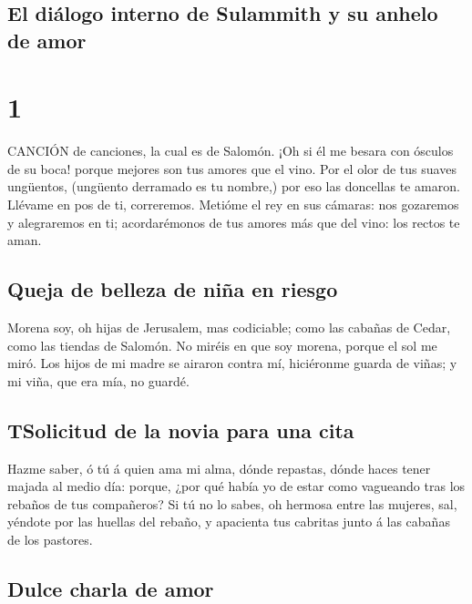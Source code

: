 \hypertarget{el-diuxe1logo-interno-de-sulammith-y-su-anhelo-de-amor}{%
\subsection{El diálogo interno de Sulammith y su anhelo de
amor}\label{el-diuxe1logo-interno-de-sulammith-y-su-anhelo-de-amor}}

\hypertarget{section}{%
\section{1}\label{section}}

 CANCIÓN de canciones, la cual es de Salomón. 
¡Oh si él me besara con ósculos de su boca! porque mejores son tus
amores que el vino.  Por el olor de tus suaves ungüentos,
(ungüento derramado es tu nombre,) por eso las doncellas te amaron.
 Llévame en pos de ti, correremos. Metióme el rey en sus
cámaras: nos gozaremos y alegraremos en ti; acordarémonos de tus amores
más que del vino: los rectos te aman.

\hypertarget{queja-de-belleza-de-niuxf1a-en-riesgo}{%
\subsection{Queja de belleza de niña en
riesgo}\label{queja-de-belleza-de-niuxf1a-en-riesgo}}

 Morena soy, oh hijas de Jerusalem, mas codiciable; como las
cabañas de Cedar, como las tiendas de Salomón.  No miréis en
que soy morena, porque el sol me miró. Los hijos de mi madre se airaron
contra mí, hiciéronme guarda de viñas; y mi viña, que era mía, no
guardé.

\hypertarget{tsolicitud-de-la-novia-para-una-cita}{%
\subsection{TSolicitud de la novia para una
cita}\label{tsolicitud-de-la-novia-para-una-cita}}

 Hazme saber, ó tú á quien ama mi alma, dónde repastas,
dónde haces tener majada al medio día: porque, ¿por qué había yo de
estar como vagueando tras los rebaños de tus compañeros?  Si
tú no lo sabes, oh hermosa entre las mujeres, sal, yéndote por las
huellas del rebaño, y apacienta tus cabritas junto á las cabañas de los
pastores.

\hypertarget{dulce-charla-de-amor}{%
\subsection{Dulce charla de amor}\label{dulce-charla-de-amor}}

